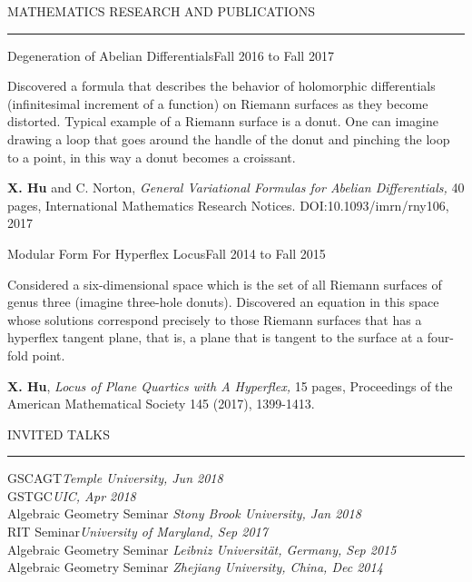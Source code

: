 \documentclass{resume} %
\renewenvironment{rSection}[1]{
\sectionskip
\textcolor{RoyalPurple}{\MakeUppercase{#1}}
\sectionlineskip
\hrule
\begin{list}{}{
\setlength{\leftmargin}{1.5em}
}
\item[]
}{
\end{list}
}
\begin{document}

\begin{rSection}{Mathematics Research and Publications}

\begin{rSubsection}{Degeneration of Abelian Differentials}{Fall 2016 to Fall 2017}{}{}
\item  Discovered a formula that describes the behavior of holomorphic differentials (infinitesimal increment of a function) on Riemann surfaces as they become distorted. Typical example of a Riemann surface is a donut. One can imagine drawing a loop that goes around the handle of the donut and pinching the loop to a point, in this way a donut becomes a croissant.
\item \textbf{X. Hu} and C. Norton,  \textit{General Variational Formulas for Abelian Differentials,} 40 pages, International Mathematics Research Notices. DOI:10.1093/imrn/rny106, 2017
\end{rSubsection}




\begin{rSubsection}{Modular Form For Hyperflex Locus}{Fall 2014 to Fall 2015}{}{}
\item Considered a six-dimensional space which is the set of all Riemann surfaces of genus three (imagine three-hole donuts). Discovered an equation in this space whose solutions correspond precisely to those Riemann surfaces that has a hyperflex tangent plane, that is, a plane that is tangent to the surface at a four-fold point.
\item \textbf{X. Hu},  \textit{Locus of Plane Quartics with A Hyperflex,} 15 pages,
Proceedings of the American Mathematical Society 145 (2017), 1399-1413.
\end{rSubsection}

\end{rSection}


\begin{rSection}{Invited Talks} \itemsep -2pt
{GSCAGT}\hfill {\em Temple University, Jun 2018} \\
{GSTGC}\hfill {\em UIC, Apr 2018} \\
{Algebraic Geometry Seminar} \hfill {\em Stony Brook University, Jan 2018} \\
{RIT Seminar}\hfill {\em University of Maryland, Sep 2017}\\
{Algebraic Geometry Seminar} \hfill {\em Leibniz Universit\"at, Germany, Sep 2015} \\
{Algebraic Geometry Seminar} \hfill {\em Zhejiang University, China, Dec 2014} \\
\end{rSection}
\end{document}
